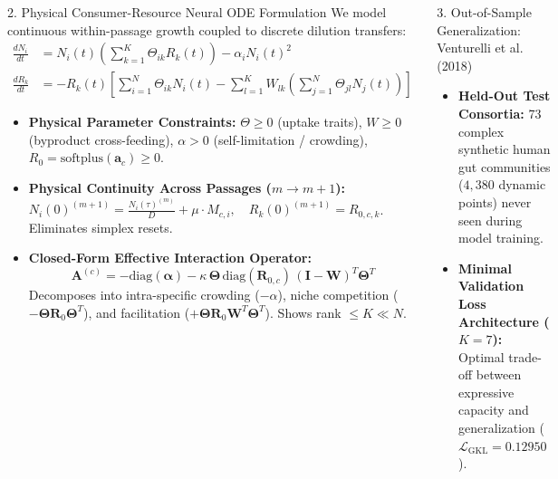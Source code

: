 \documentclass[final]{beamer}
\newlength{\colwidth}
\begin{document}
\begin{frame}[t]
\begin{columns}[t]
\begin{minipage}{\colwidth}
  \begin{block}{2. Physical Consumer-Resource Neural ODE Formulation}
    We model continuous within-passage growth coupled to discrete dilution transfers:
    \begin{align*}
      \frac{dN_i}{dt} &= N_i(t) \left( \sum_{k=1}^K \Theta_{ik} R_k(t) \right) - \alpha_i N_i(t)^2 \\
      \frac{dR_k}{dt} &= - R_k(t) \left[ \sum_{i=1}^N \Theta_{ik} N_i(t) - \sum_{l=1}^K W_{lk} \left( \sum_{j=1}^N \Theta_{jl} N_j(t) \right) \right]
    \end{align*}
    \begin{itemize}
      \item \textbf{Physical Parameter Constraints:} $\Theta \ge 0$ (uptake traits), $W \ge 0$ (byproduct cross-feeding), $\alpha > 0$ (self-limitation / crowding), $R_0 = \text{softplus}(\mathbf{a}_c) \ge 0$.
      \item \textbf{Physical Continuity Across Passages ($m \to m+1$):}
        $N_i(0)^{(m+1)} = \frac{N_i(\tau)^{(m)}}{D} + \mu \cdot M_{c, i}, \quad R_k(0)^{(m+1)} = R_{0, c, k}$. Eliminates simplex resets.
      \item \textbf{Closed-Form Effective Interaction Operator:}
        \begin{equation*}
          \mathbf{A}^{(c)} = -\text{diag}(\mathbf{\alpha}) - \kappa \, \mathbf{\Theta} \, \text{diag}(\mathbf{R}_{0, c}) \, (\mathbf{I} - \mathbf{W})^T \mathbf{\Theta}^T
        \end{equation*}
        Decomposes into intra-specific crowding ($-\alpha$), niche competition ($-\mathbf{\Theta}\mathbf{R}_0\mathbf{\Theta}^T$), and facilitation ($+\mathbf{\Theta}\mathbf{R}_0\mathbf{W}^T\mathbf{\Theta}^T$). Shows rank $\le K \ll N$.
    \end{itemize}
  \end{block}

  \begin{block}{3. Out-of-Sample Generalization: Venturelli et al. (2018)}
    \begin{itemize}
      \item \textbf{Held-Out Test Consortia:} 73 complex synthetic human gut communities ($4{,}380$ dynamic points) never seen during model training.
      \item \textbf{Minimal Validation Loss Architecture ($K=7$):} Optimal trade-off between expressive capacity and generalization ($\mathcal{L}_{\text{GKL}} = \mathbf{0.12950}$).
    \end{itemize}


\end{block}
\end{minipage}
\end{columns}
\end{frame}
\end{document}
